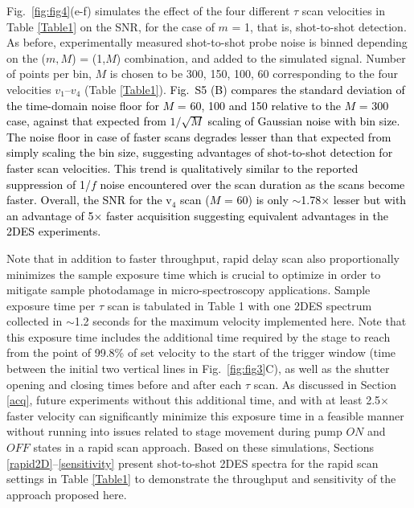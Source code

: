 \documentclass[%
aip,
amsmath,amssymb,
preprint,%
]{revtex4-2}
\newcommand*{\si}[1]{\textcolor{black}{ #1}}
\begin{document}
Fig.~\ref{fig:fig4}(e-f) simulates the effect of the four different $\tau$ scan velocities in Table \ref{Table1} on the SNR, for the case of $m$ = 1, that is, shot-to-shot detection. As before, experimentally measured shot-to-shot probe noise is binned depending on the ($m,M$) = (1,$M$) combination, and added to the simulated signal. Number of points per bin, $M$ is chosen to be 300, 150, 100, 60 corresponding to the four velocities $v_1$--$v_4$ (Table \ref{Table1}). \si{Fig.~S5 (B) compares the standard deviation of the time-domain noise floor for $M$ = 60, 100 and 150 relative to the $M$ = 300 case, against that expected from $1/\sqrt{M}$ scaling of Gaussian noise with bin size. The noise floor in case of faster scans degrades lesser than that expected from simply scaling the bin size, suggesting advantages of shot-to-shot detection for faster scan velocities. This trend is qualitatively similar to the reported\cite{Kearns2017}  suppression of 1/$f$ noise encountered over the scan duration as the scans become faster. Overall, the SNR for the v$_4$ scan ($M$ = 60) is only $\sim$1.78$\times$ lesser but with an advantage of 5$\times$ faster acquisition suggesting equivalent advantages in the 2DES experiments.} %

Note that in addition to faster throughput, rapid delay scan also proportionally minimizes the sample exposure time which is crucial to optimize in order to mitigate sample photodamage in micro-spectroscopy applications. Sample exposure time per $\tau$ scan is tabulated in Table 1 with one 2DES spectrum collected in $\sim$1.2 seconds for the maximum velocity implemented here. Note that this exposure time includes the additional time required by the stage to reach from the point of 99.8\% of set velocity to the start of the trigger window (time between the initial two vertical lines in Fig.~\ref{fig:fig3}C), as well as the shutter opening and closing times before and after each $\tau$ scan. As discussed in Section \ref{acq}, future experiments without this additional time, and with at least 2.5$\times$ faster velocity can significantly minimize this exposure time in a feasible manner without running into issues related to stage movement during pump $ON$ and $OFF$ states in a rapid scan approach. Based on these simulations, Sections \ref{rapid2D}--\ref{sensitivity} present shot-to-shot 2DES spectra for the rapid scan settings in Table \ref{Table1} to demonstrate the throughput and sensitivity of the approach proposed here.
\end{document}
